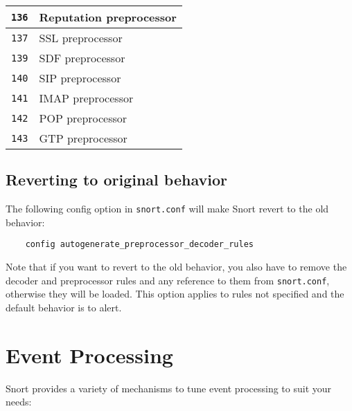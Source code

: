 \documentclass[english]{report}
\begin{document}
\begin{table}[h]
\begin{center}
\begin{tabular}{| l | l |}
\hline
\texttt{136} & Reputation preprocessor \\

\hline
\texttt{137} & SSL preprocessor \\

\hline
\texttt{139} & SDF preprocessor \\

\hline
\texttt{140} & SIP preprocessor \\

\hline
\texttt{141} & IMAP preprocessor \\

\hline
\texttt{142} & POP preprocessor \\

\hline
\texttt{143} & GTP preprocessor \\
\hline
\end{tabular}
\end{center}
\end{table}


\subsection{Reverting to original behavior}

The following config option in \texttt{snort.conf} will make Snort revert to the
old behavior:

\begin{verbatim}
    config autogenerate_preprocessor_decoder_rules
\end{verbatim}

Note that if you want to revert to the old behavior, you also have to remove
the decoder and preprocessor rules and any reference to them from
\texttt{snort.conf}, otherwise they will be loaded.  This option applies to
rules not specified and the default behavior is to alert.

\section{Event Processing}

Snort provides a variety of mechanisms to tune event processing to suit your
needs:
\end{document}
